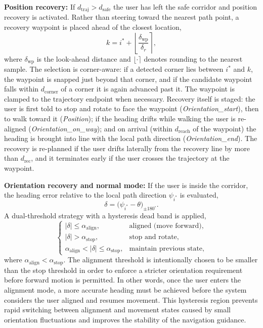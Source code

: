 \documentclass[12pt]{report}
\begin{document}
\textbf{Position recovery:} If $d_{\text{traj}}>d_{\text{safe}}$ the user has left the safe corridor and position recovery is activated. Rather than steering toward the nearest path point, a recovery waypoint is placed ahead of the closest location,
\[
k=i^\ast+\left\lfloor \frac{\delta_{\text{wp}}}{\delta_r}\right\rceil ,
\]
where $\delta_{\text{wp}}$ is the look-ahead distance and $\lfloor\cdot\rceil$ denotes rounding to the nearest sample. The selection is corner-aware: if a detected corner lies between $i^\ast$ and $k$, the waypoint is snapped just beyond that corner, and if the candidate waypoint falls within $d_{\text{corner}}$ of a corner it is again advanced past it. The waypoint is clamped to the trajectory endpoint when necessary. Recovery itself is staged: the user is first told to stop and rotate to face the waypoint (\emph{Orientation\_start}), then to walk toward it (\emph{Position}); if the heading drifts while walking the user is re-aligned (\emph{Orientation\_on\_way}); and on arrival (within $d_{\text{reach}}$ of the waypoint) the heading is brought into line with the local path direction (\emph{Orientation\_end}). The recovery is re-planned if the user drifts laterally from the recovery line by more than $d_{\text{rec}}$, and it terminates early if the user crosses the trajectory at the waypoint.

\textbf{Orientation recovery and normal mode:} If the user is inside the corridor, the heading error relative to the local path direction $\psi_{i^\ast}$ is evaluated,
\[
\delta=\bigl(\psi_{i^\ast}-\theta\bigr)_{\pm 180^\circ}.
\]
A dual-threshold strategy with a hysteresis dead band is applied,
\[
\begin{cases}
|\delta|\le\alpha_{\text{align}}, & \text{aligned (move forward)},\\[4pt]
|\delta|>\alpha_{\text{stop}}, & \text{stop and rotate},\\[4pt]
\alpha_{\text{align}}<|\delta|\le\alpha_{\text{stop}}, & \text{maintain previous state},
\end{cases}
\]
where $\alpha_{\text{align}} < \alpha_{\text{stop}}$. The alignment threshold is intentionally chosen to be smaller than the stop threshold in order to enforce a stricter orientation requirement before forward motion is permitted. In other words, once the user enters the alignment mode, a more accurate heading must be achieved before the system considers the user aligned and resumes movement. This hysteresis region prevents rapid switching between alignment and movement states caused by small orientation fluctuations and improves the stability of the navigation guidance.
\end{document}
